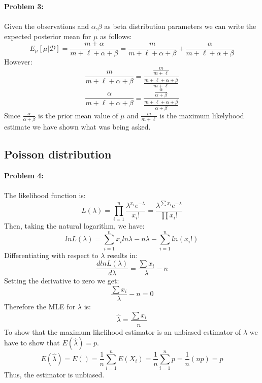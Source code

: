 \documentclass{article}
\begin{document}
\textbf{Problem 3:}\\\\
Given the observations and $\alpha$,$\beta$ as beta distribution parameters we can write the expected posterior mean for $\mu$ as follows:
\[ E_{\mu}[\mu|\mathcal{D}]=\frac{m+\alpha}{m+\ell+\alpha+\beta}=\frac{m}{m+\ell+\alpha+\beta}+
\frac{\alpha}{m+\ell+\alpha+\beta}\]
However:
\[\frac{m}{m+\ell+\alpha+\beta}=\frac{\frac{m}{m+\ell}}{\frac{m+\ell+\alpha+\beta}{m+\ell}}\]
\[\frac{\alpha}{m+\ell+\alpha+\beta}=\frac{\frac{\alpha}{\alpha+\beta}}{\frac{m+\ell+\alpha+\beta}{\alpha+\beta}}\]
Since $\frac{\alpha}{\alpha+\beta}$ is the prior mean value of $\mu$ and $\frac{m}{m+\ell}$ is the maximum likelyhood estimate we have shown what was being asked.

\subsection{Poisson distribution}
\textbf{Problem 4:}\\\\
The likelihood function is:
\[ L(\lambda) =\prod_{i=1}^{n}{\frac{\lambda^{x_i}e^{-\lambda}}{x_i !}} = \frac{\lambda^{\sum {x_i}}e^{-\lambda}}{\prod{x_i !}} \]
Then, taking the natural logarithm, we have:
\[ ln L(\lambda) = \sum_{i=1}^{n}{x_i ln \lambda} - n\lambda - \sum_{i=1}^{n}{ln(x_i !)} \]
Differentiating with respect to $\lambda$ results in:
\[ \frac{d ln L(\lambda)}{d\lambda} = \frac{\sum{x_i}}{\lambda} - n \]
Setting the derivative to zero we get:
\[ \frac{\sum{x_i}}{\lambda} - n = 0 \]
Therefore the MLE for $\lambda$ is:
\[  \hat{\lambda} = \frac{\sum{x_i}}{n}\]
To show that the maximum likelihood estimator is an unbiased estimator of $\lambda$ we have to show that $E(\hat{\lambda}) = p$.
\[ E(\hat{\lambda}) = E() = \frac{1}{n}\sum_{i=1}^{n}{E(X_i)} =\frac{1}{n}\sum_{i=1}^{n}{p} = \frac{1}{n}(np) = p \]
Thus, the estimator is unbiased.	
	
\end{document}
